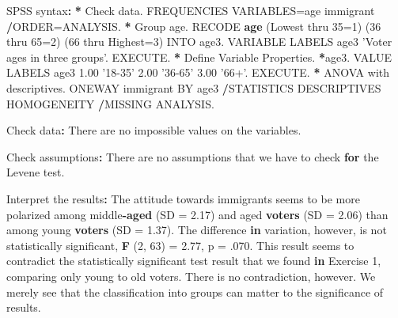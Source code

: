 \documentclass[a4paper]{book}
\newenvironment{Shaded}{\begin{snugshade}}{\end{snugshade}}
\newcommand{\KeywordTok}[1]{\textcolor[rgb]{0,0,0}{\textbf{#1}}}
\newcommand{\DataTypeTok}[1]{\textcolor[rgb]{0,0,0}{#1}}
\newcommand{\DecValTok}[1]{\textcolor[rgb]{0.00,0.00,0.00}{#1}}
\newcommand{\FloatTok}[1]{\textcolor[rgb]{0.00,0.00,0.00}{#1}}
\newcommand{\StringTok}[1]{\textcolor[rgb]{0.00,0.00,0.00}{#1}}
\newcommand{\ControlFlowTok}[1]{\textcolor[rgb]{0.00,0.00,0.00}{\textbf{#1}}}
\newcommand{\OperatorTok}[1]{\textcolor[rgb]{0.00,0.00,0.00}{\textbf{#1}}}
\newcommand{\ErrorTok}[1]{\textcolor[rgb]{0.00,0.00,0.00}{\textbf{#1}}}
\newcommand{\NormalTok}[1]{#1}
\theoremstyle{definition}
\theoremstyle{definition}
\theoremstyle{definition}
\theoremstyle{remark}
\begin{document}
\begin{Shaded}
\begin{Highlighting}[]
\NormalTok{SPSS syntax}\OperatorTok{:}\StringTok{  }
\StringTok{  }
\ErrorTok{*}\StringTok{ }\NormalTok{Check data.  }
\NormalTok{FREQUENCIES VARIABLES=age immigrant  }
  \OperatorTok{/}\NormalTok{ORDER=ANALYSIS.  }
\OperatorTok{*}\StringTok{ }\NormalTok{Group age.  }
\NormalTok{RECODE }\KeywordTok{age}\NormalTok{ (Lowest thru }\DecValTok{35}\NormalTok{=}\DecValTok{1}\NormalTok{) (}\DecValTok{36}\NormalTok{ thru }\DecValTok{65}\NormalTok{=}\DecValTok{2}\NormalTok{)  }
\NormalTok{  (}\DecValTok{66}\NormalTok{ thru }\DataTypeTok{Highest=}\DecValTok{3}\NormalTok{) INTO age3.  }
\NormalTok{VARIABLE LABELS  age3 }\StringTok{'Voter ages in three groups'}\NormalTok{.  }
\NormalTok{EXECUTE.  }
\OperatorTok{*}\StringTok{ }\NormalTok{Define Variable Properties.  }
\OperatorTok{*}\NormalTok{age3.  }
\NormalTok{VALUE LABELS age3  }
  \FloatTok{1.00} \StringTok{'18-35'}  
  \FloatTok{2.00} \StringTok{'36-65'}  
  \FloatTok{3.00} \StringTok{'66+'}\NormalTok{.  }
\NormalTok{EXECUTE.  }
\OperatorTok{*}\StringTok{ }\NormalTok{ANOVA with descriptives.  }
\NormalTok{ONEWAY immigrant BY age3  }
  \OperatorTok{/}\NormalTok{STATISTICS DESCRIPTIVES HOMOGENEITY   }
  \OperatorTok{/}\NormalTok{MISSING ANALYSIS.  }
  
\NormalTok{Check data}\OperatorTok{:}\StringTok{  }
\StringTok{  }
\NormalTok{There are no impossible values on the variables.  }
  
\NormalTok{Check assumptions}\OperatorTok{:}\StringTok{  }
\StringTok{  }
\NormalTok{There are no assumptions that we have to check }\ControlFlowTok{for}  
\NormalTok{the Levene test.  }
  
\NormalTok{Interpret the results}\OperatorTok{:}\StringTok{  }
\StringTok{  }
\NormalTok{The attitude towards immigrants seems to be more polarized   }
\NormalTok{among middle}\OperatorTok{-}\KeywordTok{aged}\NormalTok{ (}\DataTypeTok{SD =} \FloatTok{2.17}\NormalTok{) and aged }\KeywordTok{voters}\NormalTok{ (}\DataTypeTok{SD =} \FloatTok{2.06}\NormalTok{)   }
\NormalTok{than among young }\KeywordTok{voters}\NormalTok{ (}\DataTypeTok{SD =} \FloatTok{1.37}\NormalTok{).   }
\NormalTok{The difference }\ControlFlowTok{in}\NormalTok{ variation, however, is not statistically   }
\NormalTok{significant, }\KeywordTok{F}\NormalTok{ (}\DecValTok{2}\NormalTok{, }\DecValTok{63}\NormalTok{) =}\StringTok{ }\FloatTok{2.77}\NormalTok{, p =}\StringTok{ }\NormalTok{.}\DecValTok{070}\NormalTok{.  }
\NormalTok{This result seems to contradict the statistically significant  }
\NormalTok{test result that we found }\ControlFlowTok{in}\NormalTok{ Exercise }\DecValTok{1}\NormalTok{, comparing only young   }
\NormalTok{to old voters. There is no contradiction, however. We merely  }
\NormalTok{see that the classification into groups can matter to the   }
\NormalTok{significance of results.  }
\end{Highlighting}
\end{Shaded}
\end{document}
